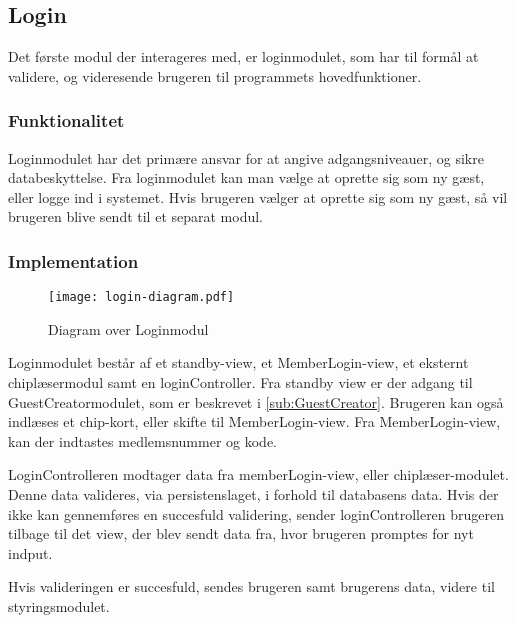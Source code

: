 \subsection{Login}
\label{sub:login}

Det første modul der interageres med, er loginmodulet, som har til formål at validere, og videresende brugeren til programmets hovedfunktioner.

\subsubsection{Funktionalitet}
\label{ssub:login_funktionalitet}

Loginmodulet har det primære ansvar for at angive adgangsniveauer, og sikre databeskyttelse. Fra loginmodulet kan man vælge at oprette sig som ny gæst, eller logge ind i systemet. Hvis brugeren vælger at oprette sig som ny gæst, så vil brugeren blive sendt til et separat modul.

\subsubsection{Implementation}
\label{ssub:login_implementation}

\begin{figure}
  \centering
  \texttt{[image: login-diagram.pdf]}
  \caption{Diagram over Loginmodul}
\end{figure}

Loginmodulet består af et standby-view, et MemberLogin-view, et eksternt chiplæsermodul samt en loginController. Fra standby view er der adgang til GuestCreatormodulet, som er beskrevet i \cref{sub:GuestCreator}. Brugeren kan også indlæses et chip-kort, eller skifte til MemberLogin-view. Fra MemberLogin-view, kan der indtastes medlemsnummer og kode.

LoginControlleren modtager data fra memberLogin-view, eller chiplæser-modulet. Denne data valideres, via persistenslaget, i forhold til databasens data. Hvis der ikke kan gennemføres en succesfuld validering, sender loginControlleren brugeren tilbage til det view, der blev sendt data fra, hvor brugeren promptes for nyt indput.

Hvis valideringen er succesfuld, sendes brugeren samt brugerens data, videre til styringsmodulet.
